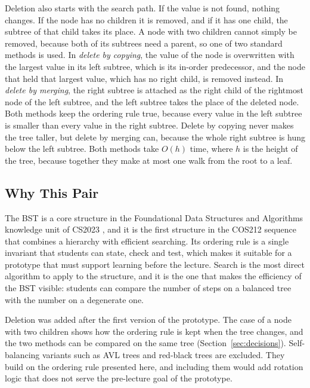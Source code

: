 Deletion also starts with the search path. If the value is not found, nothing changes. If the node has no children it is removed, and if it has one child, the subtree of that child takes its place. A node with two children cannot simply be removed, because both of its subtrees need a parent, so one of two standard methods is used. In \emph{delete by copying}, the value of the node is overwritten with the largest value in its left subtree, which is its in-order predecessor, and the node that held that largest value, which has no right child, is removed instead. In \emph{delete by merging}, the right subtree is attached as the right child of the rightmost node of the left subtree, and the left subtree takes the place of the deleted node. Both methods keep the ordering rule true, because every value in the left subtree is smaller than every value in the right subtree. Delete by copying never makes the tree taller, but delete by merging can, because the whole right subtree is hung below the left subtree. Both methods take $O(h)$ time, where $h$ is the height of the tree, because together they make at most one walk from the root to a leaf.

\subsection{Why This Pair}
The BST is a core structure in the Foundational Data Structures and Algorithms knowledge unit of CS2023 \cite{Kumar2024}, and it is the first structure in the COS212 sequence that combines a hierarchy with efficient searching. Its ordering rule is a single invariant that students can state, check and test, which makes it suitable for a prototype that must support learning before the lecture. Search is the most direct algorithm to apply to the structure, and it is the one that makes the efficiency of the BST visible: students can compare the number of steps on a balanced tree with the number on a degenerate one.

Deletion was added after the first version of the prototype. The case of a node with two children shows how the ordering rule is kept when the tree changes, and the two methods can be compared on the same tree (Section~\ref{sec:decisions}). Self-balancing variants such as AVL trees and red-black trees are excluded. They build on the ordering rule presented here, and including them would add rotation logic that does not serve the pre-lecture goal of the prototype.